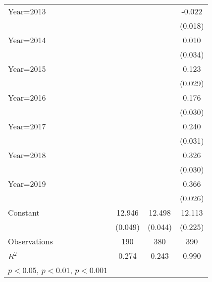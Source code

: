 {\begin{table}[htbp]
\begin{tabular}{l*{3}{c}}
Year=2013                       &                     &                     &      -0.022         \\
                                &                     &                     &     (0.018)         \\
Year=2014                       &                     &                     &       0.010         \\
                                &                     &                     &     (0.034)         \\
Year=2015                       &                     &                     &       0.123\sym{***}\\
                                &                     &                     &     (0.029)         \\
Year=2016                       &                     &                     &       0.176\sym{***}\\
                                &                     &                     &     (0.030)         \\
Year=2017                       &                     &                     &       0.240\sym{***}\\
                                &                     &                     &     (0.031)         \\
Year=2018                       &                     &                     &       0.326\sym{***}\\
                                &                     &                     &     (0.030)         \\
Year=2019                       &                     &                     &       0.366\sym{***}\\
                                &                     &                     &     (0.026)         \\
Constant                        &      12.946\sym{***}&      12.498\sym{***}&      12.113\sym{***}\\
                                &     (0.049)         &     (0.044)         &     (0.225)         \\
                    \hline
Observations                    &         190         &         380         &         390         \\
$R^2$                           &       0.274         &       0.243         &       0.990         \\
\hline\hline
{\footnotesize \sym{*} \(p<0.05\), \sym{**} \(p<0.01\), \sym{***} \(p<0.001\)}\\
\end{tabular}
\end{table}
}
